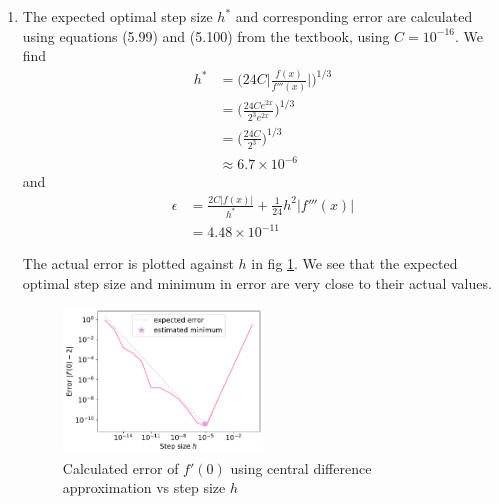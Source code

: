 \documentclass{article}
\begin{document}
\begin{enumerate}
\begin{enumerate}
    \item The expected optimal step size $h^*$ and corresponding error are calculated using equations (5.99) and (5.100) from the textbook, using $C=10^{-16}$. We find
    \begin{align*}
        h^* &= \bigg(24 C \bigg|\frac{f(x)}{f'''(x)}\bigg|\bigg)^{1/3}\\
            &= \bigg(\frac{24 C e^{2x}}{2^{3} e^{2x}}\bigg)^{1/3}\\
            &= \bigg(\frac{24 C}{2^3}\bigg)^{1/3}\\
            &\approx 6.7\times 10^{-6}
    \end{align*}
    and
    \begin{align*}
        \epsilon &= \frac{2C|f(x)|}{h^*} + \frac{1}{24}h^2|f'''(x)|\\
        &= 4.48\times10^{-11}
    \end{align*}
    
    The actual error is plotted against $h$ in fig \ref{fig:1b}. We see that the expected optimal step size and minimum in error are very close to their actual values.
    \begin{figure}[h]
        \centering 
        \includegraphics[width=0.5\textwidth]{Q1b.pdf}
        \caption{Calculated error of $f'(0)$ using central difference approximation vs step size $h$}
        \label{fig:1b}
      \end{figure}


\end{enumerate}
\end{enumerate}
\end{document}
